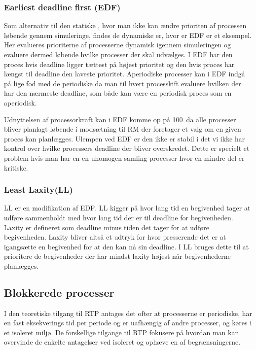\subsubsection{Earliest deadline first (EDF)}
Som alternativ til den statiske \sched, hvor man ikke kan ændre prioriten af processen løbende gennem simuleringe, findes de dynamiske \sched er, hvor er EDF er et eksempel. Her evalueres prioriterne af processerne dynamisk igennem simuleringen og evaluere dermed løbende hvilke processer der skal udvælges. I EDF har den proces hvis deadline ligger tættest på højest prioritet og den hvis proces har længst til deadline den laveste prioritet. Aperiodiske processer kan i EDF indgå på lige fod med de periodiske da man til hvert processkift evaluere hvilken der har den nærmeste deadline, som både kan være en periodisk proces som en aperiodisk.

Udnyttelsen af processorkraft kan i EDF komme op på 100\, da alle processer bliver planlagt løbende i modsætning til RM der foretager et valg om en given proces kan planlægges.  Ulempen ved EDF er den ikke er stabil i det vi ikke har kontrol over hvilke processers deadline der bliver overskredet. Dette er specielt et problem hvis man har en en uhomogen samling processer hvor en mindre del er kritiske.

\subsubsection{Least Laxity(LL)}
LL er en modifikation af EDF. LL kigger på hvor lang tid en begivenhed tager at udføre sammenholdt med hvor lang tid der er til deadline for begivenheden. Laxity er defineret som deadline minus tiden det tager for at udføre begivenheden. Laxity bliver altså et udtryk for hvor presserende det er at igangsætte en begivenhed for at den kan nå sin deadline. I LL bruges dette til at prioritere de begivenheder der har mindst laxity højest når begivenhederne planlægges. 

\subsection{Blokkerede processer}
I den teoretiske tilgang til RTP antages det ofter at processerne er periodiske, har en fast eksekverings tid per periode og er uafhængig af andre processer, og køres i et isoleret miljø. De forskellige tilgange til RTP fokusere på hvordan man kan overvinde de enkelte antagelser ved isoleret og ophæve en af begrænsningerne.

